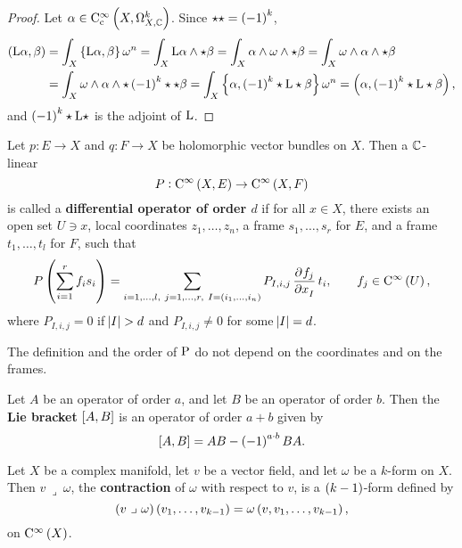 \begin{proof}
Let $ \alpha \in \COCc{X}{k} $. Since $ \star\star = \br{-1}^k $,
\begin{align*}
\br{\L\alpha, \beta}
& = \int_X \cbr{\L\alpha, \beta}\omega^n
= \int_X \L\alpha \wedge \star\beta
= \int_X \alpha \wedge \omega \wedge \star\beta
= \int_X \omega \wedge \alpha \wedge \star\beta \\
& = \int_X \omega \wedge \alpha \wedge \star\br{-1}^k\star\star\beta
= \int_X \cbr{\alpha, \br{-1}^k\star\L\star\beta}\omega^n
= \br{\alpha, \br{-1}^k\star\L\star\beta},
\end{align*}
and $ \br{-1}^k\star\L\star $ is the adjoint of $ \L $.
\end{proof}

\begin{definition}
Let $ p : E \to X $ and $ q : F \to X $ be holomorphic vector bundles on $ X $. Then a $ \CC $-linear
$$ P : \Ci{X, E} \to \Ci{X, F} $$
is called a \textbf{differential operator of order $ d $} if for all $ x \in X $, there exists an open set $ U \ni x $, local coordinates $ z_1, \dots, z_n $, a frame $ s_1, \dots, s_r $ for $ E $, and a frame $ t_1, \dots, t_l $ for $ F $, such that
$$ P\br{\sum_{i = 1}^r f_is_i} = \sum_{i = 1, \dots, l, \ j = 1, \dots, r, \ I = \br{i_1, \dots, i_n}} P_{I, i, j}\dpd{f_j}{x_I}t_i, \qquad f_j \in \Ci{U}, $$
where $ P_{I, i, j} = 0 $ if $ \abs{I} > d $ and $ P_{I, i, j} \ne 0 $ for some $ \abs{I} = d $.
\end{definition}

\begin{fact*}
The definition and the order of $ \P $ do not depend on the coordinates and on the frames.
\end{fact*}

\pagebreak

\begin{notation}
Let $ A $ be an operator of order $ a $, and let $ B $ be an operator of order $ b $. Then the \textbf{Lie bracket} $ \sbr{A, B} $ is an operator of order $ a + b $ given by
$$ \sbr{A, B} = AB - \br{-1}^{a \cdot b}BA. $$
\end{notation}

\begin{definition}
Let $ X $ be a complex manifold, let $ v $ be a vector field, and let $ \omega $ be a $ k $-form on $ X $. Then $ v \ \lrcorner \ \omega $, the \textbf{contraction} of $ \omega $ with respect to $ v $, is a $ \br{k - 1} $-form defined by
$$ \br{v \ \lrcorner \ \omega}\br{v_1, \dots, v_{k - 1}} = \omega\br{v, v_1, \dots, v_{k - 1}}, $$
on $ \Ci{X} $.
\end{definition}

